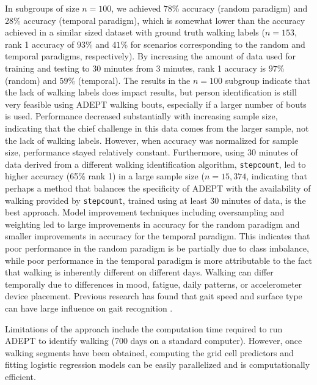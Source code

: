 In subgroups of size $n=100$, we achieved $78$\% accuracy (random paradigm) and $28$\% accuracy (temporal paradigm), which is somewhat lower than the accuracy achieved in a similar sized dataset with ground truth walking labels ($n=153$, rank 1 accuracy of $93$\% and $41$\%  for scenarios corresponding to the random and temporal paradigms, respectively). By increasing the amount of data used for training and testing to $30$ minutes from $3$ minutes, rank 1 accuracy is $97$\% (random) and $59$\% (temporal). The results in the $n=100$ subgroup indicate that the lack of walking labels does impact results, but person identification is still very feasible using ADEPT walking bouts, especially if a larger number of bouts is used. Performance decreased substantially with increasing sample size, indicating that the chief challenge in this data comes from the larger sample, not the lack of walking labels. However, when accuracy was normalized for sample size, performance stayed relatively constant. Furthermore, using 30 minutes of data derived from a different walking identification algorithm, \texttt{stepcount}, led to higher accuracy (65\% rank 1) in a large sample size ($n=15{,}374$, indicating that perhaps a method that balances the specificity of ADEPT with the availability of walking provided by \texttt{stepcount}, trained using at least 30 minutes of data, is the best approach. Model improvement techniques including oversampling and weighting led to large improvements in accuracy for the random paradigm and smaller improvements in accuracy for the temporal paradigm. This indicates that poor performance in the random paradigm is be partially due to class imbalance, while poor performance in the temporal paradigm is more attributable to the fact that walking is inherently different on different days.  Walking can differ temporally due to differences in mood, fatigue, daily patterns, or accelerometer device placement. Previous research has found that gait speed and surface type can have large influence on gait recognition \citep{gaitspeed}. 

Limitations of the approach include the computation time required to run ADEPT to identify walking (700 days on a standard computer). However, once walking segments have been obtained, computing the grid cell predictors and fitting logistic regression models can be easily parallelized and is computationally efficient. 

